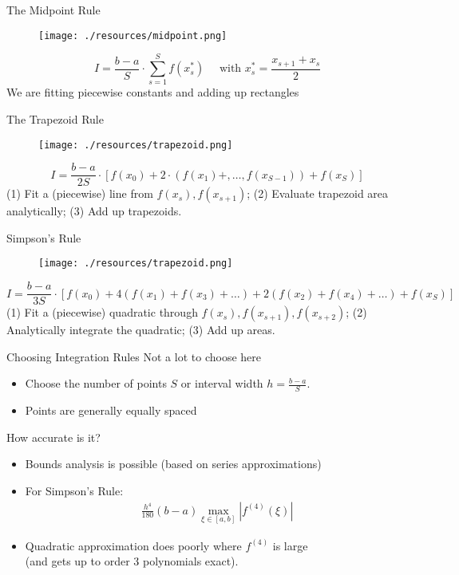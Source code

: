 \begin{frame}{The Midpoint Rule}
\begin{figure}[htbp]
\begin{center}
\texttt{[image: ./resources/midpoint.png]}
\end{center}
\end{figure}
$$ I = \frac{b-a}{S} \cdot \sum_{s=1}^S f(x_s^{*}) \quad \text{ with }  x_s^{*} = \frac{x_{s+1} + x_{s}}{2}$$
We are fitting \alert{piecewise constants} and adding up \alert{rectangles}
\end{frame}




\begin{frame}{The Trapezoid Rule}
\begin{figure}[htbp]
\begin{center}
\texttt{[image: ./resources/trapezoid.png]}
\end{center}
\end{figure}
$$ I = \frac{b-a}{2 S} \cdot \left[f(x_0) + 2\cdot(f(x_1)+,\ldots,f(x_{S-1})) +  f(x_S) \right] $$
(1) Fit a (piecewise) line from $f(x_s),f(x_{s+1})$; (2) Evaluate trapezoid area analytically; (3) Add up trapezoids.
\end{frame}

\begin{frame}{Simpson's Rule}
\begin{figure}[htbp]
\begin{center}
\texttt{[image: ./resources/trapezoid.png]}
\end{center}
\end{figure}
$$ I = \frac{b-a}{3S} \cdot \left[f(x_0) + 4(f(x_1)+ f(x_3) +\ldots) + 2(f(x_2)+ f(x_4)+\ldots )  +  f(x_S) \right] $$
(1) Fit a (piecewise) quadratic through $f(x_s),f(x_{s+1}),f(x_{s+2})$; (2) Analytically integrate the quadratic; (3) Add up areas.
\end{frame}


\begin{frame}{Choosing Integration Rules}
Not a lot to choose here
\begin{itemize}
\item Choose the number of points $S$ or interval width $h = \frac{b-a}{S}$.
\item Points are generally equally spaced
\end{itemize}
How accurate is it?
\begin{itemize}
\item \alert{Bounds analysis} is possible (based on series approximations)
\item For Simpson's Rule:
\begin{align*}
\frac{h^{4}}{180}(b-a) \max _{\xi \in[a, b]}\left|f^{(4)}(\xi)\right|
\end{align*}
\item Quadratic approximation does poorly where $f^{(4)}$ is large \\
(and gets up to order 3 polynomials exact).
\end{itemize}
\end{frame}

